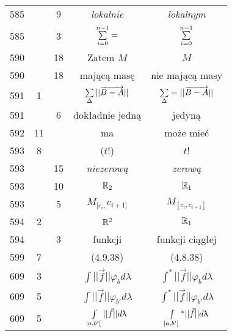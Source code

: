 \documentclass[a4paper,11pt]{article}
\begin{document}
\begin{center}
\begin{tabular}{|c|c|c|c|c|}
    585 & &  9 & \emph{lokalnie} & \emph{lokalnym} \\
    585 & &  3 & $\sum\limits_{ i = 0 }^{ n - 1 } =$
           & $\sum\limits_{ i = 0 }^{ n - 1 }$ \\
    590 & & 18 & Zatem $M$ & $M$ \\
    590 & & 18 & mającą masę & nie mającą masy \\
    591 &  1 & & $\sum\limits_{ \Delta } || \overrightarrow{ B - A } ||$
           & $\sum\limits_{ \Delta } = || \overrightarrow{ B - A } ||$ \\
    591 & &  6 & dokładnie jedną & jedyną \\
    592 & 11 & & ma & może mieć \\
    593 &  8 & & ($ t $!) & $ t $! \\
    593 & & 15 & \emph{niezerową} & \emph{zerową} \\
    593 & & 10 & $\mathbb{R}_{ 2 }$ & $\mathbb{R}_{ 1 }$ \\
    593 & &  5 & $M_{ [ c_{ i }, } c_{ i + 1 ] }$
           & $M_{ [ c_{ i }, c_{ i + 1 } ] }$ \\
    594 &  2 & & $\mathbb{R}^{ 2 }$ & $\mathbb{R}_{ 1 }$ \\
    594 & &  3 & funkcji & funkcji ciągłej \\
    599 &  7 & & (4.9.38) & (4.8.38) \\
    609 &  3 & & $\int || \vec{ f } || \varphi_{ b } d\lambda$
           & $\int^{ * } || \vec{ f } || \varphi_{ b } d\lambda$ \\
    609 &  5 & & $\int || \vec{ f } || \varphi_{ b' } d\lambda$
           & $\int^{ * } || \vec{ f } || \varphi_{ b' } d\lambda$ \\
    609 &  5 & & $\int\limits_{ | a, b' [ } || \vec{ f } || d\uplambda$
           & $\int\limits_{ | a, b' [ }{^{ * }}
             || \vec{ f } || d\uplambda$ \\ \hline
  \end{tabular}


\end{center}
\end{document}
